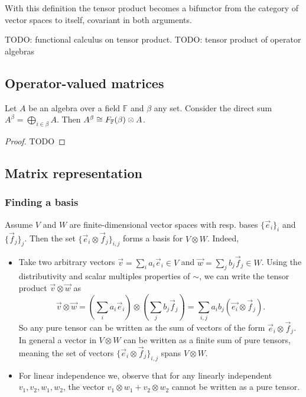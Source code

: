 With this definition the tensor product becomes a bifunctor from the category of vector spaces to itself, covariant in both arguments.

TODO: functional calculus on tensor product.
TODO: tensor product of operator algebras


\subsection{Operator-valued matrices}
\begin{proposition}
Let $A$ be an algebra over a field $\mathbb{F}$ and $\beta$ any set. Consider the direct sum $A^\beta = \bigoplus_{i\in\beta}A$. Then $A^\beta \cong F_{\mathbb{F}}(\beta)\otimes A$.
\end{proposition}
\begin{proof}
TODO
\end{proof}


\subsection{Matrix representation}
\subsubsection{Finding a basis}
Assume $V$ and $W$ are finite-dimensional vector spaces with resp. bases $\{\vec{e}_i\}_i$ and $\{\vec{f}_j\}_j$. Then the set $\{ \vec{e}_i\otimes \vec{f}_j \}_{i,j}$ forms a basis for $V\otimes W$. Indeed,
\begin{itemize}
\item Take two arbitrary vectors $\vec{v} = \sum_i a_i \vec{e}_i \in V$ and $\vec{w} = \sum_j b_j \vec{f}_j \in W$.
Using the distributivity and scalar multiples properties of $\sim$, we can write the tensor product $\vec{v}\otimes \vec{w}$ as
\begin{equation} \vec{v}\otimes \vec{w} = (\sum_i a_i \vec{e}_i)\otimes(\sum_j b_j \vec{f}_j) = \sum_{i,j}a_ib_j (\vec{e_i}\otimes \vec{f}_j). \label{eq:vtensorw} \end{equation}
So any pure tensor can be written as the sum of vectors of the form $\vec{e}_i\otimes \vec{f}_j$. In general a vector in $V\otimes W$ can be written as a finite sum of pure tensors, meaning the set of vectors $\{ \vec{e}_i\otimes \vec{f}_j \}_{i,j}$ spans $V\otimes W$.
\item For linear independence we, observe that for any linearly independent $v_1, v_2, w_1, w_2$, the vector $v_1\otimes w_1 + v_2\otimes w_2$ cannot be written as a pure tensor.
\end{itemize}

